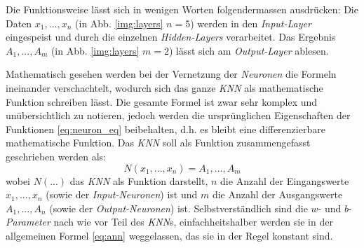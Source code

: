 Die Funktionsweise lässt sich in wenigen Worten folgendermassen ausdrücken: Die Daten $x_1,...,x_n$ (in Abb. \ref{img:layers} $n=5$) werden in den \textit{Input-Layer} eingespeist und durch die einzelnen \textit{Hidden-Layers} verarbeitet. Das Ergebnis $A_1,...,A_m$ (in Abb. \ref{img:layers} $m=2$) lässt sich am \textit{Output-Layer} ablesen. 

Mathematisch gesehen werden bei der Vernetzung der \textit{Neuronen} die Formeln ineinander verschachtelt, wodurch sich das ganze \textit{KNN} als mathematische Funktion schreiben lässt. Die gesamte Formel ist zwar sehr komplex und unübersichtlich zu notieren, jedoch werden die ursprünglichen Eigenschaften der Funktionen \ref{eq:neuron_eq} beibehalten, d.h. es bleibt eine differenzierbare mathematische Funktion. Das \textit{KNN} soll als Funktion zusammengefasst geschrieben werden als:
\begin{equation}\label{eq:ann}
N(x_1,...,x_n) = A_1,...,A_m
\end{equation}
wobei $N(...)$ das \textit{KNN} als Funktion darstellt, $n$ die Anzahl der Eingangswerte $x_1,...,x_n$ (sowie der \textit{Input-Neuronen}) ist und $m$ die Anzahl der Ausgangswerte $A_1,...,A_n$ (sowie der \textit{Output-Neuronen}) ist. Selbstverständlich sind die $w$- und $b$-\textit{Parameter} nach wie vor Teil des \textit{KNN}s, einfachheitshalber werden sie in der allgemeinen Formel \ref{eq:ann} weggelassen, das sie in der Regel konstant sind.


